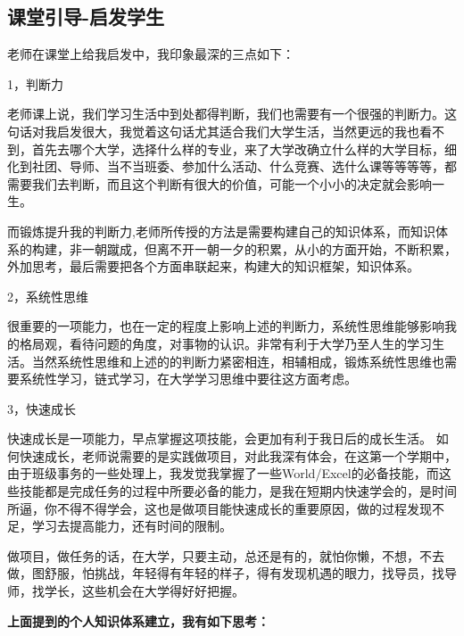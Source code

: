 \documentclass{article}
\begin{document}
\subsection{课堂引导-启发学生}
老师在课堂上给我启发中，我印象最深的三点如下：\par
1，判断力\par
老师课上说，我们学习生活中到处都得判断，我们也需要有一个很强的判断力。这句话对我启发很大，我觉着这句话尤其适合我们大学生活，当然更远的我也看不到，首先去哪个大学，选择什么样的专业，来了大学改确立什么样的大学目标，细化到社团、导师、当不当班委、参加什么活动、什么竞赛、选什么课等等等等，都需要我们去判断，而且这个判断有很大的价值，可能一个小小的决定就会影响一生。\par 
而锻炼提升我的判断力,老师所传授的方法是需要构建自己的知识体系，而知识体系的构建，非一朝蹴成，但离不开一朝一夕的积累，从小的方面开始，不断积累，外加思考，最后需要把各个方面串联起来，构建大的知识框架，知识体系。\par

2，系统性思维\par
很重要的一项能力，也在一定的程度上影响上述的判断力，系统性思维能够影响我的格局观，看待问题的角度，对事物的认识。非常有利于大学乃至人生的学习生活。当然系统性思维和上述的的判断力紧密相连，相辅相成，锻炼系统性思维也需要系统性学习，链式学习，在大学学习思维中要往这方面考虑。\par
3，快速成长\par
快速成长是一项能力，早点掌握这项技能，会更加有利于我日后的成长生活。
如何快速成长，老师说需要的是实践做项目，对此我深有体会，在这第一个学期中，由于班级事务的一些处理上，我发觉我掌握了一些World/Excel的必备技能，而这些技能都是完成任务的过程中所要必备的能力，是我在短期内快速学会的，是时间所逼，你不得不得学会，这也是做项目能快速成长的重要原因，做的过程发现不足，学习去提高能力，还有时间的限制。\par
做项目，做任务的话，在大学，只要主动，总还是有的，就怕你懒，不想，不去做，图舒服，怕挑战，年轻得有年轻的样子，得有发现机遇的眼力，找导员，找导师，找学长，这些机会在大学得好好把握。\par


\textbf{上面提到的个人知识体系建立，我有如下思考：}
\end{document}
